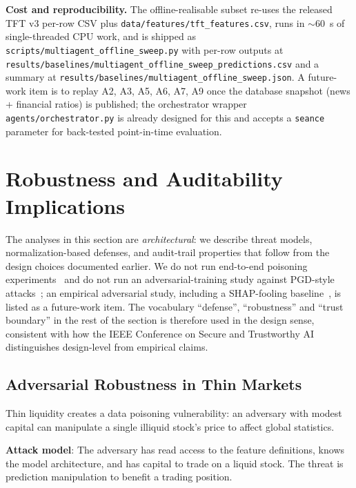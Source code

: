 \documentclass[conference]{IEEEtran}
\begin{document}
\textbf{Cost and reproducibility.} The offline-realisable subset re-uses the released TFT v3 per-row CSV plus \texttt{data/features/tft\_features.csv}, runs in $\sim\!60$~s of single-threaded CPU work, and is shipped as \texttt{scripts/multiagent\_offline\_sweep.py} with per-row outputs at \texttt{results/baselines/multiagent\_offline\_sweep\_predictions.csv} and a summary at \texttt{results/baselines/multiagent\_offline\_sweep.json}. A future-work item is to replay A2, A3, A5, A6, A7, A9 once the database snapshot (news + financial ratios) is published; the orchestrator wrapper \texttt{agents/orchestrator.py} is already designed for this and accepts a \texttt{seance} parameter for back-tested point-in-time evaluation.

\section{Robustness and Auditability Implications}\label{sec:security}

The analyses in this section are \emph{architectural}: we describe threat models, normalization-based defenses, and audit-trail properties that follow from the design choices documented earlier. We do not run end-to-end poisoning experiments~\cite{ref:data_poisoning} and do not run an adversarial-training study against PGD-style attacks~\cite{ref:madry_pgd}; an empirical adversarial study, including a SHAP-fooling baseline~\cite{ref:slack_fooling}, is listed as a future-work item. The vocabulary ``defense'', ``robustness'' and ``trust boundary'' in the rest of the section is therefore used in the design sense, consistent with how the IEEE Conference on Secure and Trustworthy AI distinguishes design-level from empirical claims.

\subsection{Adversarial Robustness in Thin Markets}

Thin liquidity creates a data poisoning vulnerability: an adversary with modest capital can manipulate a single illiquid stock's price to affect global statistics. 

\textbf{Attack model}: The adversary has read access to the feature definitions, knows the model architecture, and has capital to trade on a liquid stock. The threat is prediction manipulation to benefit a trading position.
\end{document}

